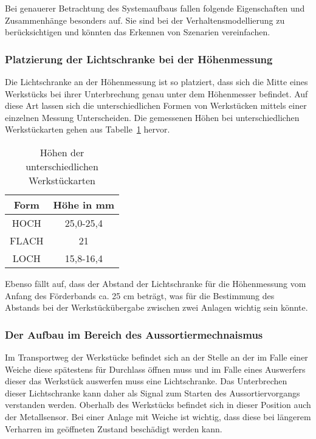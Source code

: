 Bei genauerer Betrachtung des Systemaufbaus fallen folgende Eigenschaften und Zusammenhänge besonders auf. 
Sie sind bei der Verhaltensmodellierung zu berücksichtigen und könnten das Erkennen von Szenarien vereinfachen.

\subsubsection{Platzierung der Lichtschranke bei der Höhenmessung}

Die Lichtschranke an der Höhenmessung ist so platziert, dass sich die Mitte eines Werkstücks bei ihrer Unterbrechung genau unter dem Höhenmesser befindet. 
Auf diese Art lassen sich die unterschiedlichen Formen von Werkstücken mittels einer einzelnen Messung Unterscheiden. 
Die gemessenen Höhen bei unterschiedlichen Werkstückarten gehen aus Tabelle~\ref{tab:werkstuecke} hervor.

\begin{table}[h]
    \begin{center}
        \begin{tabular}{ |c|c| }
            \hline
            Form                     & Höhe in mm \\
            \hline\hline
            HOCH                 &  25,0-25,4\\
            \hline
            FLACH                     & 21 \\
            \hline
            LOCH               & 15,8-16,4 \\
            \hline
        \end{tabular}
    \end{center}
    \caption{Höhen der unterschiedlichen Werkstückarten}
    \label{tab:werkstuecke}
\end{table}

Ebenso fällt auf, dass der Abstand der Lichtschranke für die Höhenmessung vom Anfang des Förderbands ca. 25 cm beträgt, was für die Bestimmung des Abstands bei der Werkstückübergabe zwischen zwei Anlagen wichtig sein könnte.

\subsubsection{Der Aufbau im Bereich des Aussortiermechnaismus}

Im Transportweg der Werkstücke befindet sich an der Stelle an der im Falle einer Weiche diese spätestens für Durchlass öffnen muss und im Falle eines Auswerfers dieser das Werkstück auswerfen muss eine Lichtschranke.
Das Unterbrechen dieser Lichtschranke kann daher als Signal zum Starten des Aussortiervorgangs verstanden werden. 
Oberhalb des Werkstücks befindet sich in dieser Position auch der Metallsensor.
Bei einer Anlage mit Weiche ist wichtig, dass diese bei längerem Verharren im geöffneten Zustand beschädigt werden kann.

